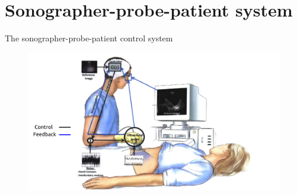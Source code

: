 \section{Sonographer-probe-patient system}


{
\begin{frame}{The sonographer-probe-patient control system}
      \begin{figure}
        \centering
        \includegraphics[width=1.0\textwidth]{./figures/sonographer-probe-patient/versions/drawing-v00.png}
      \end{figure}
\end{frame}
}

